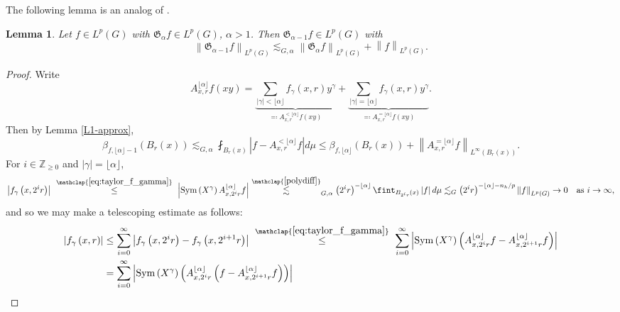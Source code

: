 \documentclass[11pt,reqno]{amsart}
\newtheorem{lemma}[theorem]{Lemma}
\newcommand{\1}{\mathbf 1}
\begin{document}
The following lemma is an analog of \cite[Lemma 3]{dorronsoro1985characterization}.
\begin{lemma}\label{lem:lemma3}
Let $f\in L^p\left(G\right)$ with $\mathfrak{G}_\alpha f\in L^p\left(G\right)$, $\alpha>1$. Then $\mathfrak{G}_{\alpha-1}f\in L^p\left(G\right)$ with
\[
\left\|\mathfrak{G}_{\alpha-1}f\right\|_{L^p\left(G\right)}\lesssim_{G,\alpha} \left\|\mathfrak{G}_\alpha f\right\|_{L^p\left(G\right)}+\left\|f\right\|_{L^p\left(G\right)}.
\]
\end{lemma}
\begin{proof}
Write
\[
A^{\lfloor\alpha\rfloor}_{x,r}f\left(xy\right)=\underbrace{\sum_{\left|\gamma\right|<\lfloor\alpha\rfloor}f_\gamma\left(x,r\right)y^\gamma}_{\eqqcolon A^{<\lfloor\alpha\rfloor}_{x,r}f\left(xy\right)}+\underbrace{\sum_{\left|\gamma\right|=\lfloor\alpha\rfloor}f_\gamma\left(x,r\right)y^\gamma}_{\eqqcolon A^{=\lfloor\alpha\rfloor}_{x,r}f\left(xy\right)}.
\]
Then by Lemma \ref{L1-approx},
\begin{equation}\label{eq:betaOneStepDown}
\beta_{f,\lfloor\alpha\rfloor-1}\left(B_r\left(x\right)\right)\lesssim_{G,\alpha}\fint_{B_r\left(x\right)} \left|f-A^{<\lfloor\alpha\rfloor}_{x,r}f\right|d\mu \le \beta_{f,\lfloor\alpha\rfloor}\left(B_r\left(x\right)\right)+\left\|A^{=\lfloor\alpha\rfloor}_{x,r}f\right\|_{L^\infty\left(B_r\left(x\right)\right)}.
\end{equation}
For $i\in \mathbb{Z}_{\ge 0}$ and $\left|\gamma\right|=\lfloor\alpha\rfloor$,
\[
\left|f_\gamma\left(x,2^ir\right)\right|~\stackrel{\mathclap{\eqref{eq:taylor_f_gamma}}}{\le}~ \left|\operatorname{Sym}\left(X^\gamma\right)A^{\lfloor\alpha\rfloor}_{x,2^ir}f\right|\stackrel{\mathclap{\eqref{polydiff}}}{\lesssim}_{G,\alpha} \left(2^ir\right)^{-\lfloor\alpha\rfloor}\fint_{B_{2^ir}\left(x\right)}\left|f\right|d\mu \lesssim_G \left(2^ir\right)^{-\lfloor\alpha\rfloor-n_h/p}\left\|f\right\|_{L^p\left(G\right)}\to 0\quad \mathrm{as~} i\to\infty,
\]
and so we may make a telescoping estimate as follows:
\begin{align*}
\left|f_\gamma\left(x,r\right)\right|&\le \sum_{i=0}^\infty \left|f_\gamma\left(x,2^ir\right)-f_\gamma\left(x,2^{i+1}r\right)\right|~\stackrel{\mathclap{\eqref{eq:taylor_f_gamma}}}{\le}~\sum_{i=0}^\infty \left|\operatorname{Sym}\left(X^\gamma\right)\left(A^{\lfloor\alpha\rfloor}_{x,2^ir}f-A^{\lfloor\alpha\rfloor}_{x,2^{i+1}r}f\right)\right| \\
&=\sum_{i=0}^\infty \left|\operatorname{Sym}\left(X^\gamma\right)\left(A^{\lfloor\alpha\rfloor}_{x,2^ir}\left(f-A^{\lfloor\alpha\rfloor}_{x,2^{i+1}r}f\right)\right)\right|\\

\end{align*}
\end{proof}
\end{document}
